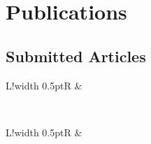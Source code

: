 \documentclass[10pt]{article}
\newcommand\VRule{\color{lightgray}\vrule width 0.5pt}
\begin{document}
\section*{Publications}
\vspace{.3cm}
\subsection*{Submitted Articles}
\vspace{.3cm}
\begin{tabular}{L!{\VRule}R}
&
\end{tabular}
\\[5pt]
\begin{tabular}{L!{\VRule}R}
&
\end{tabular}
\\[5pt]
\end{document}
